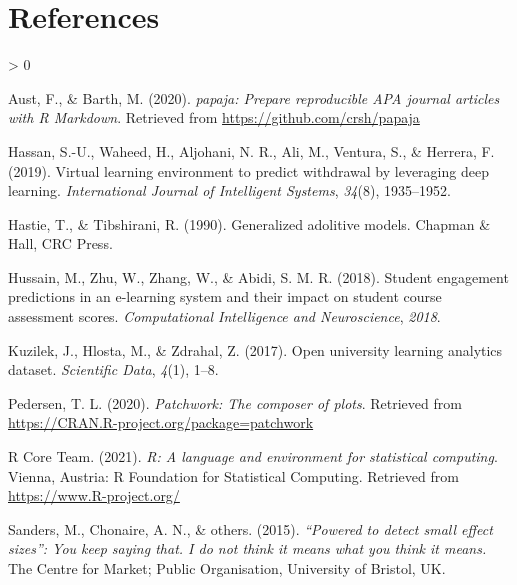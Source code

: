 \documentclass[
  english,
  man,mask,floatsintext]{apa6}
\newlength{\cslhangindent}
\newenvironment{CSLReferences}[2] %
 {%
  \setlength{\parindent}{0pt}
  \ifodd #1 \everypar{\setlength{\hangindent}{\cslhangindent}}\ignorespaces\fi
  \ifnum #2 > 0
  \setlength{\parskip}{#2\baselineskip}
  \fi
 }%
 {}
\begin{document}
\newpage

\hypertarget{references}{%
\section{References}\label{references}}

\begingroup
\setlength{\parindent}{-0.5in}
\setlength{\leftskip}{0.5in}

\hypertarget{refs}{}
\begin{CSLReferences}{1}{0}
\leavevmode\hypertarget{ref-R-papaja}{}%
Aust, F., \& Barth, M. (2020). \emph{{papaja}: {Prepare} reproducible {APA} journal articles with {R Markdown}}. Retrieved from \url{https://github.com/crsh/papaja}

\leavevmode\hypertarget{ref-hassan2019virtual}{}%
Hassan, S.-U., Waheed, H., Aljohani, N. R., Ali, M., Ventura, S., \& Herrera, F. (2019). Virtual learning environment to predict withdrawal by leveraging deep learning. \emph{International Journal of Intelligent Systems}, \emph{34}(8), 1935--1952.

\leavevmode\hypertarget{ref-hastie1990generalized}{}%
Hastie, T., \& Tibshirani, R. (1990). Generalized adolitive models. Chapman \& Hall, CRC Press.

\leavevmode\hypertarget{ref-hussain2018student}{}%
Hussain, M., Zhu, W., Zhang, W., \& Abidi, S. M. R. (2018). Student engagement predictions in an e-learning system and their impact on student course assessment scores. \emph{Computational Intelligence and Neuroscience}, \emph{2018}.

\leavevmode\hypertarget{ref-kuzilek2017open}{}%
Kuzilek, J., Hlosta, M., \& Zdrahal, Z. (2017). Open university learning analytics dataset. \emph{Scientific Data}, \emph{4}(1), 1--8.

\leavevmode\hypertarget{ref-R-patchwork}{}%
Pedersen, T. L. (2020). \emph{Patchwork: The composer of plots}. Retrieved from \url{https://CRAN.R-project.org/package=patchwork}

\leavevmode\hypertarget{ref-R-base}{}%
R Core Team. (2021). \emph{R: A language and environment for statistical computing}. Vienna, Austria: R Foundation for Statistical Computing. Retrieved from \url{https://www.R-project.org/}

\leavevmode\hypertarget{ref-sanders2015powered}{}%
Sanders, M., Chonaire, A. N., \& others. (2015). \emph{{``Powered to detect small effect sizes''}: You keep saying that. I do not think it means what you think it means.} The Centre for Market; Public Organisation, University of Bristol, UK.


\end{CSLReferences}
\end{document}
